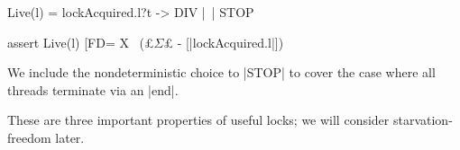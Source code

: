 \begin{cspm}
Live(l) =   lockAcquired.l?t -> DIV
                  |~| STOP

assert Live(l) [FD= 
          X \ (£$\Sigma$£ - [|lockAcquired.l|])
\end{cspm}

We include the nondeterministic choice to |STOP| to cover the case where all threads terminate via an |end|.

These are three important properties of useful locks; we will consider starvation-freedom later.








